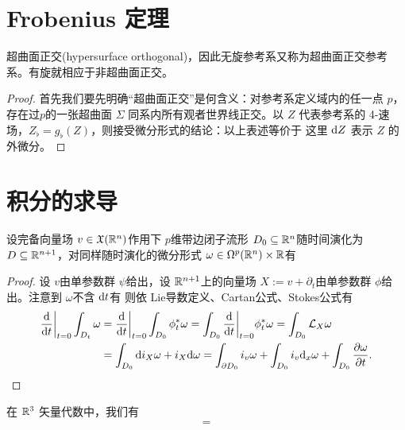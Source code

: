 \section{Frobenius 定理}\label{sec:Frobenius}


\begin{theorem}
    超曲面正交(hypersurface orthogonal)，因此无旋参考系又称为超曲面正交参考系。有旋就相应于非超曲面正交。
\end{theorem}
\begin{proof}
    首先我们要先明确“超曲面正交”是何含义：对参考系定义域内的任一点 $p$，存在过$p$的一张超曲面 $\Sigma$ 同系内所有观者世界线正交。以 $Z$ 代表参考系的 4-速场，$Z_\flat=g_\flat(Z)$，则接受微分形式的结论：以上表述等价于
    这里 $\dd Z$ 表示 $Z$ 的外微分。
\end{proof}

\section{积分的求导}

\begin{theorem}
    设完备向量场 $v\in\mathfrak X(\mathbb{R}^n)$作用下 $p$维带边闭子流形 $D_0\subseteq\mathbb{R}^n$随时间演化为 $D\subseteq\mathbb{R}^{n+1}$，对同样随时演化的微分形式 $\omega\in\Omega^p(\mathbb{R}^n)\times\mathbb{R}$有 
\end{theorem}
\begin{proof}
    设 $v$由单参数群 $\psi$给出，设 $\mathbb{R}^{n+1}$上的向量场 $X:=v+\partial_t$由单参数群 $\phi$给出。注意到 $\omega$不含 $\dd t$有
    则依 Lie导数定义、Cartan公式、Stokes公式有
    \begin{align*} \dv{t}\bigg|_{t=0}\int_{D_t}\omega&=\dv{t}\bigg|_{t=0}\int_{D_0}\phi_t^*\omega =\int_{D_0}\dv{t}\bigg|_{t=0}\phi_t^*\omega=\int_{D_0}\mathcal L_X\omega\\ &=\int_{D_0}\dd i_X\omega+i_X\dd\omega =\int_{\partial D_0}i_v\omega+\int_{D_0}i_v\dd_x\omega+\int_{D_0}\frac{\partial\omega}{\partial t}. \qedhere \end{align*}
\end{proof}

\begin{example}
    在 $\mathbb{R}^3$ 矢量代数中，我们有
    \begin{align*}
        =
    \end{align*}
\end{example}
